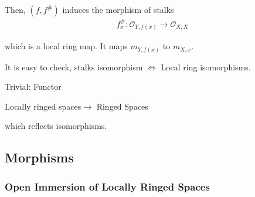 \documentclass[Total.tex]{subfiles}
\begin{document}
			Then, $(f,f^\#)$ induces the morphism of stalks
			\begin{gather*}
				f^\#_x:\mathcal{O}_{Y,f(x)}\rightarrow \mathcal{O}_{X,X}
			\end{gather*}
			
			which is a local ring map. It maps $m_{Y,f(x)}$ to $m_{X,x}$.
			
			It is easy to check, stalks isomorphism $\Leftrightarrow$ Local ring isomorphisms.
			
			
			\begin{Def}
				Trivial: Functor
				\begin{center}
					Locally ringed spaces$\rightarrow$ Ringed Spaces
				\end{center}
				
				which reflects isomorphisms. 
			\end{Def}
			\subsection{Morphisms}
			\subsubsection{Open Immersion of Locally Ringed Spaces}
				
\end{document}

